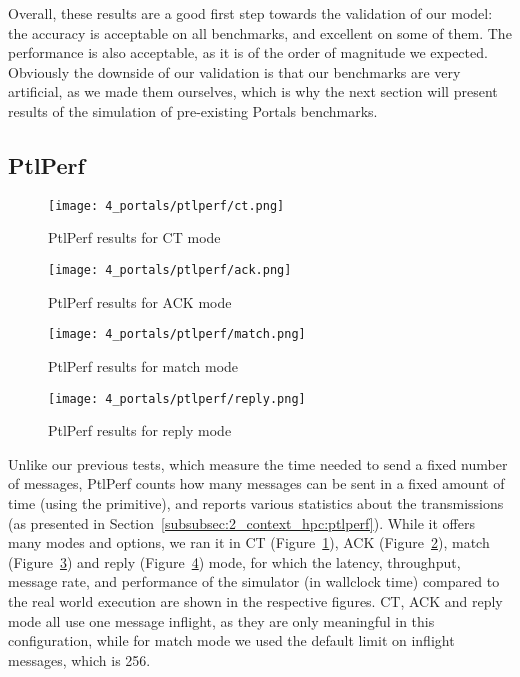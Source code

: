 Overall, these results are a good first step towards the validation of our
model: the accuracy is acceptable on all benchmarks, and excellent on some of
them. The performance is also acceptable, as it is of the order of magnitude we
expected. Obviously the downside of our validation is that our benchmarks are
very artificial, as we made them ourselves, which is why the next section will
present results of the simulation of pre-existing Portals benchmarks.

\subsection{PtlPerf}
\label{sec:4_portals:ptlperf}

\begin{figure}[!ht]
    \centering
    \texttt{[image: 4\_portals/ptlperf/ct.png]}
    \caption{PtlPerf results for CT mode}
    \label{fig:4_portals:ptlperf_ct}
\end{figure}

\begin{figure}[!ht]
    \centering
    \texttt{[image: 4\_portals/ptlperf/ack.png]}
    \caption{PtlPerf results for ACK mode}
    \label{fig:4_portals:ptlperf_ack}
\end{figure}

\begin{figure}[!p]
    \centering
    \texttt{[image: 4\_portals/ptlperf/match.png]}
    \caption{PtlPerf results for match mode}
    \label{fig:4_portals:ptlperf_match}
\end{figure}

\begin{figure}[!p]
    \centering
    \texttt{[image: 4\_portals/ptlperf/reply.png]}
    \caption{PtlPerf results for reply mode}
    \label{fig:4_portals:ptlperf_reply}
\end{figure}

Unlike our previous tests, which measure the time needed to send a fixed number
of messages, PtlPerf counts how many messages can be sent in a fixed amount of
time (using the  primitive), and reports various statistics about the
transmissions (as presented in Section~\ref{subsubsec:2_context_hpc:ptlperf}).
While it offers many modes and options, we ran it in CT
(Figure~\ref{fig:4_portals:ptlperf_ct}), ACK
(Figure~\ref{fig:4_portals:ptlperf_ack}), match
(Figure~\ref{fig:4_portals:ptlperf_match}) and reply
(Figure~\ref{fig:4_portals:ptlperf_reply}) mode, for which the latency,
throughput, message rate, and performance of the simulator (in wallclock time)
compared to the real world execution are shown in the respective figures. CT,
ACK and reply mode all use one message inflight, as they are only meaningful in
this configuration, while for match mode we used the default limit on inflight
messages, which is 256.

